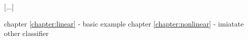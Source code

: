 [...]

chapter \ref{chapter:linear}  - basic example 
chapter \ref{chapter:nonlinear}  - imiatate other classifier 
